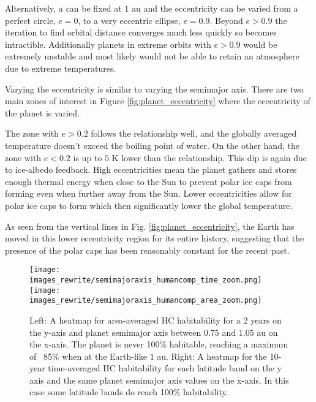\documentclass[12pt, onecolumn]{revtex4-2}    %
\begin{document}
Alternatively, $a$ can be fixed at $1$ au and the eccentricity can be varied from a perfect circle, $e = 0$, to a very eccentric ellipse, $e = 0.9$.
Beyond $e > 0.9$ the iteration to find orbital distance converges much less quickly so becomes intractible.
Additionally planets in extreme orbits with $e > 0.9$ would be extremely unstable and most likely would not be able to retain an atmosphere due to extreme temperatures.

Varying the eccentricity is similar to varying the semimajor axis.
There are two main zones of interest in Figure \ref{fig:planet_eccentricity} where the eccentricity of the planet is varied.

The zone with $e > 0.2$ follows the relationship well, and the globally averaged temperature doesn't exceed the boiling point of water.
On the other hand, the zone with $e < 0.2$ is up to $5$ K lower than the relationship.
This dip is again due to ice-albedo feedback.
High eccentricities mean the planet gathers and stores enough thermal energy when close to the Sun to prevent polar ice caps from forming even when further away from the Sun.
Lower eccentricities allow for polar ice caps to form which then significantly lower the global temperature.

As seen from the vertical lines in Fig. \ref{fig:planet_eccentricity}, the Earth has moved in this lower eccentricity region for its entire history, suggesting that the presence of the polar caps has been reasonably constant for the recent past.

\begin{figure}[t]
  \texttt{[image: images\_rewrite/semimajoraxis\_humancomp\_time\_zoom.png]}
  \texttt{[image: images\_rewrite/semimajoraxis\_humancomp\_area\_zoom.png]}
  \caption{
    Left: A heatmap for area-averaged HC habitability for a 2 years on the y-axis and planet semimajor axis between $0.75$ and $1.05$ au on the x-axis.
    The planet is never 100\% habitable, reaching a maximum of ~85\% when at the Earth-like $1$ au.
    Right: A heatmap for the 10-year time-averaged HC habitability for each latitude band on the y axis and the same planet semimajor axis values on the x-axis.
    In this case some latitude bands do reach 100\% habitability.
  }
  \label{fig:qualitative_semimajoraxis}
\end{figure}
\end{document}
